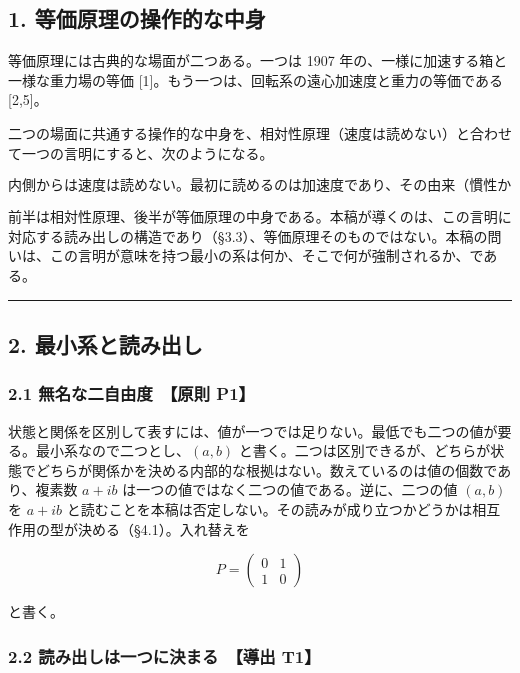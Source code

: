 \documentclass[
  a4paper,
]{ltjsarticle}
\begin{document}
\subsection{1.
等価原理の操作的な中身}\label{ux7b49ux4fa1ux539fux7406ux306eux64cdux4f5cux7684ux306aux4e2dux8eab}

等価原理には古典的な場面が二つある。一つは 1907
年の、一様に加速する箱と一様な重力場の等価
{[}1{]}。もう一つは、回転系の遠心加速度と重力の等価である {[}2,5{]}。

二つの場面に共通する操作的な中身を、相対性原理（速度は読めない）と合わせて一つの言明にすると、次のようになる。

\[
\boxed{\text{内側からは速度は読めない。最初に読めるのは加速度であり、その由来（慣性か重力か）は読めない。}}
\]

前半は相対性原理、後半が等価原理の中身である。本稿が導くのは、この言明に対応する読み出しの構造であり（§3.3）、等価原理そのものではない。本稿の問いは、この言明が意味を持つ最小の系は何か、そこで何が強制されるか、である。

\begin{center}\rule{0.5\linewidth}{0.5pt}\end{center}

\subsection{2.
最小系と読み出し}\label{ux6700ux5c0fux7cfbux3068ux8aadux307fux51faux3057}

\subsubsection{2.1 無名な二自由度　【原則
P1】}\label{ux7121ux540dux306aux4e8cux81eaux7531ux5ea6-ux539fux5247-p1}

状態と関係を区別して表すには、値が一つでは足りない。最低でも二つの値が要る。最小系なので二つとし、\((a,b)\)
と書く。二つは区別できるが、どちらが状態でどちらが関係かを決める内部的な根拠はない。数えているのは値の個数であり、複素数
\(a+ib\) は一つの値ではなく二つの値である。逆に、二つの値 \((a,b)\) を
\(a+ib\)
と読むことを本稿は否定しない。その読みが成り立つかどうかは相互作用の型が決める（§4.1）。入れ替えを

\[
P=\begin{pmatrix}0&1\\1&0\end{pmatrix}
\]

と書く。

\subsubsection{2.2 読み出しは一つに決まる　【導出
T1】}\label{ux8aadux307fux51faux3057ux306fux4e00ux3064ux306bux6c7aux307eux308b-ux5c0eux51fa-t1}
\end{document}
